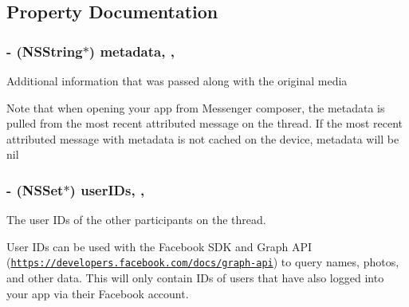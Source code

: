 \subsection{Property Documentation}
\hypertarget{interface_f_b_s_d_k_messenger_u_r_l_handler_open_from_composer_context_ae506afbcd01aff6b1ba765aa865307e2}{
\subsubsection[{metadata}]{\setlength{\rightskip}{0pt plus 5cm}-\/ (N\-S\-String$\ast$) metadata\hspace{0.3cm}{\ttfamily [read]}, {\ttfamily [nonatomic]}, {\ttfamily [copy]}}}\label{interface_f_b_s_d_k_messenger_u_r_l_handler_open_from_composer_context_ae506afbcd01aff6b1ba765aa865307e2}
Additional information that was passed along with the original media

Note that when opening your app from Messenger composer, the metadata is pulled from the most recent attributed message on the thread. If the most recent attributed message with metadata is not cached on the device, metadata will be nil \hypertarget{interface_f_b_s_d_k_messenger_u_r_l_handler_open_from_composer_context_aec97bc39429cab5358c3020ad5edd125}{
\subsubsection[{user\-I\-Ds}]{\setlength{\rightskip}{0pt plus 5cm}-\/ (N\-S\-Set$\ast$) user\-I\-Ds\hspace{0.3cm}{\ttfamily [read]}, {\ttfamily [nonatomic]}, {\ttfamily [copy]}}}\label{interface_f_b_s_d_k_messenger_u_r_l_handler_open_from_composer_context_aec97bc39429cab5358c3020ad5edd125}
The user I\-Ds of the other participants on the thread.

User I\-Ds can be used with the Facebook S\-D\-K and Graph A\-P\-I (\href{https://developers.facebook.com/docs/graph-api}{\tt https\-://developers.\-facebook.\-com/docs/graph-\/api}) to query names, photos, and other data. This will only contain I\-Ds of users that have also logged into your app via their Facebook account.

